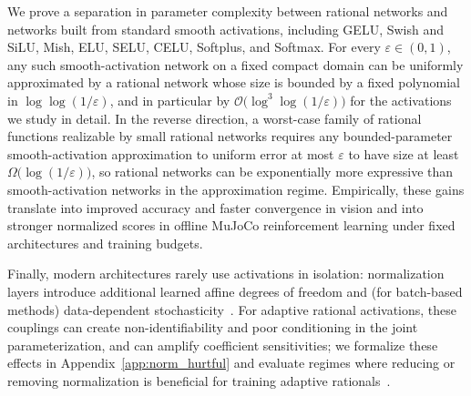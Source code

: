 \documentclass{article}
\theoremstyle{plain}
\theoremstyle{definition}
\theoremstyle{remark}
\begin{document}
We prove a separation in parameter complexity between rational networks and networks built from standard smooth activations, including GELU, Swish and SiLU, Mish, ELU, SELU, CELU, Softplus, and Softmax.  For every $\varepsilon\in(0,1)$, any such smooth-activation network on a fixed compact domain can be uniformly approximated by a rational network whose size is bounded by a fixed polynomial in $\log\log(1/\varepsilon)$, and in particular by $\mathcal{O}\bigl(\log^3\!\log(1/\varepsilon)\bigr)$ for the activations we study in detail.   {In the reverse direction, a worst-case family of rational functions realizable by small rational networks requires any bounded-parameter smooth-activation approximation to uniform error at most $\varepsilon$ to have size at least $\Omega\bigl(\log(1/\varepsilon)\bigr)$, so rational networks can be exponentially more expressive than smooth-activation networks in the approximation regime.}  Empirically, these gains translate into improved accuracy and faster convergence in vision and into stronger normalized scores in offline MuJoCo reinforcement learning under fixed architectures and training budgets.

Finally, modern architectures rarely use activations in isolation: normalization layers introduce additional learned affine degrees of freedom and (for batch-based methods) data-dependent stochasticity~\cite{ioffe2015batch,ba2016layer,wu2018group}.  For adaptive rational activations, these couplings can create non-identifiability and poor conditioning in the joint parameterization, and can amplify coefficient sensitivities; we formalize these effects in Appendix~\ref{app:norm_hurtful} and evaluate regimes where reducing or removing normalization is beneficial for training adaptive rationals~\cite{zhu2025transformerswithoutnorm}.
\end{document}
